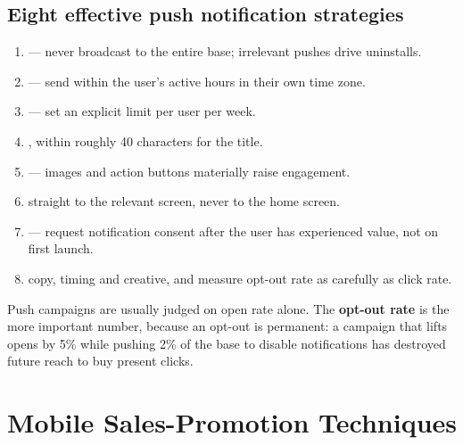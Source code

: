 \subsection{Eight effective push notification strategies}

\begin{enumerate}
\item {} --- never broadcast to the entire base;
      irrelevant pushes drive uninstalls.
\item {} --- send within the user's active hours in their own
      time zone.
\item {} --- set an explicit limit per user per week.
\item {}, within roughly 40
      characters for the title.
\item {} --- images and action buttons materially raise
      engagement.
\item {} straight to the relevant screen, never to
      the home screen.
\item {} --- request notification consent
      after the user has experienced value, not on first launch.
\item {} copy, timing and creative, and measure opt-out rate as
      carefully as click rate.
\end{enumerate}

\begin{warnbox}
Push campaigns are usually judged on open rate alone. The \textbf{opt-out rate} is
the more important number, because an opt-out is permanent: a campaign that lifts
opens by 5\% while pushing 2\% of the base to disable notifications has destroyed
future reach to buy present clicks.
\end{warnbox}

\section{Mobile Sales-Promotion Techniques}

